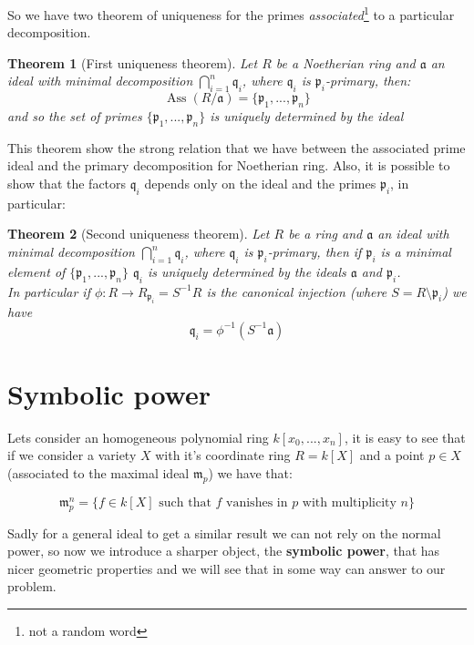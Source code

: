 \documentclass[notitlepage, a4]{book}
\theoremstyle{plain}
\newtheorem{teo}{Theorem}[section]
\theoremstyle{remark}
\theoremstyle{definition}
\newcommand{\p}{\mathfrak{p}}
\newcommand{\q}{\mathfrak{q}}
\newcommand{\mm}{\mathfrak{m}}
\newcommand{\A}{\mathfrak{a}}
\DeclareMathOperator{\Ass}{Ass}
\newcounter{que}
\begin{document}
So we have two theorem of uniqueness for the primes \textit{associated}\footnote{not a random word} to a particular decomposition. 

\begin{teo}[First uniqueness theorem]
Let $ R $ be a Noetherian ring and $ \A $ an ideal with minimal decomposition $ \bigcap_{i=1}^n \q_i $, where $ \q_i $ is $ \p_i $-primary, then:
\[ \Ass(R/ \A) = \{ \p_1 , ... , \p_n \} \]
and so the set of primes $ \{ \p_1 , ... , \p_n \} $ is uniquely determined by the ideal

\end{teo}

This theorem show the strong relation that we have between the associated prime ideal and the primary decomposition for Noetherian ring. Also, it is possible to show that the factors $ \q_i $ depends only on the ideal and the primes $ \p_i $, in particular:

\begin{teo}[Second uniqueness theorem]
Let $ R $ be a ring and $ \A $ an ideal with minimal decomposition $ \bigcap_{i=1}^n \q_i $, where $ \q_i $ is $ \p_i $-primary, then if $ \p_i $ is a minimal element of $ \{ \p_1 , ... , \p_n \} $ $ \q_i $ is uniquely determined by the ideals $ \A $ and $ \p_i $.\\
In particular if $ \phi : R \to R_{\p_i} = S^{-1} R$ is the canonical injection (where $ S = R \setminus \p_i $) we have
\[ 
\q_i = \phi ^{-1} ( S^{-1} \A  )
\]

\end{teo}


\section{Symbolic power}

	Lets consider an homogeneous polynomial ring $ k[x_0 , ... , x_n] $, it is easy to see that if we consider a variety $ X $ with it's coordinate ring $ R = k[X] $ and a point $ p \in X $ (associated to the maximal ideal $ \mm_p $)  we have that:
	
	\begin{equation}\label{eq:max_pow}
		\mm_p^n = \{ f \in k[X] \text{ such that } f \text{ vanishes in } p \text{ with multiplicity } n\}
	\end{equation}
	
	Sadly for a general ideal to get a similar result we can not rely on the normal power, so now we introduce a sharper object, the \textbf{symbolic power}, that has nicer geometric properties and we will see that in some way can answer to our problem. %
	
\end{document}
